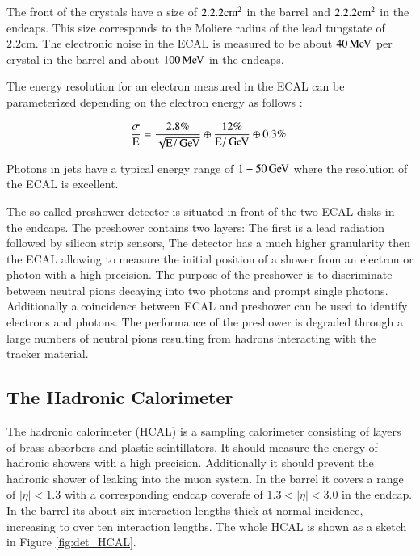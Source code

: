 The front of the crystals have a size of $2.2 \time 2.2 \si{\centi \meter \squared}$ in the barrel and $2.2 \time 2.2 \si{\centi \meter \squared}$ in the endcaps. This size corresponds to the Moliere radius of the 
lead tungstate of $2.2 \si{\centi \meter}$.
The electronic noise in the ECAL is measured to be about $40 \,\text{Me\hspace{-.08em}V}$ per crystal in the barrel and about $100 \,\text{Me\hspace{-.08em}V}$ in the endcaps.

The energy resolution for an electron measured in the ECAL can be parameterized depending on the electron energy as follows \cite{Sirunyan:2017ulk}:

\begin{equation}
\frac{\sigma}{\mathrm{E}} = \frac{2.8\%}{\sqrt{\mathrm{E}/\,\text{Ge\hspace{-.08em}V}}} \oplus \frac{12\%}{\mathrm{E} / \,\text{Ge\hspace{-.08em}V}} \oplus 0.3\%.
\end{equation}

Photons in jets have a typical energy range of $1-50 \,\text{Ge\hspace{-.08em}V}$ where the resolution of the ECAL is excellent.

The so called preshower detector is situated in front of the two ECAL disks in the endcaps.
The preshower contains two layers: The first is a lead radiation followed by silicon strip sensors,
The detector has a much higher granularity then the ECAL allowing to measure the initial position of a shower from an electron or photon with a high precision.
The purpose of the preshower is to discriminate  between neutral pions decaying into two photons and prompt single photons.
Additionally a coincidence between ECAL and preshower can be used to identify electrons and photons.
The performance of the preshower is degraded through a large numbers of neutral pions resulting from hadrons interacting with the tracker material.

\subsection{The Hadronic Calorimeter}

The hadronic calorimeter (HCAL)\cite{Bayatian:922757} is a sampling calorimeter consisting of layers of brass absorbers and plastic scintillators.
It should measure the energy of hadronic showers with a high precision. Additionally it should prevent the hadronic shower of leaking into the muon system.
In the barrel it covers a range of $|\eta|< 1.3$ with a corresponding endcap coverafe of $1.3 <|\eta|< 3.0$ in the endcap.
In the barrel its about six interaction lengths thick at normal incidence, increasing to over ten interaction lengths.
The whole HCAL is shown as a sketch in Figure \ref{fig:det_HCAL}.



